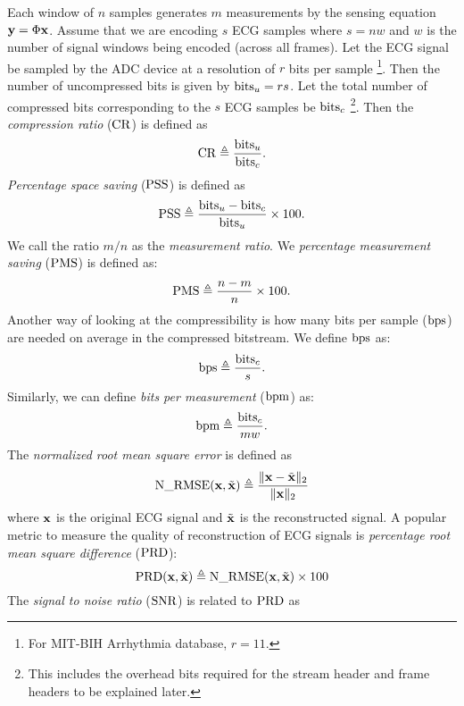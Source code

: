 Each window of $n$
samples generates $m$ measurements by the
sensing equation $\mathbf{y} = \Phi \mathbf{x}$.
Assume that we are encoding $s$ ECG samples where
$s = n w$ and $w$ is the number of signal windows
being encoded (across all frames).
Let the ECG signal be sampled by the ADC device
at a resolution of $r$ bits per sample
\footnote{For MIT-BIH Arrhythmia database, $r=11$.}.
Then the number of uncompressed bits is given by
$\mathrm{bits}_u = r s$.
Let the total number of compressed
bits corresponding to the $s$ ECG samples be
$\mathrm{bits}_c$ \footnote{This includes the overhead bits required
for the stream header and frame headers to be explained later.}.
Then the \emph{compression ratio} ($\mathrm{CR}$) is defined as
\begin{equation}
\mathrm{CR} \triangleq \frac{\mathrm{bits}_u}{\mathrm{bits}_c}.
\end{equation}
\emph{Percentage space saving} ($\mathrm{PSS}$) is defined as
\begin{equation}
\mathrm{PSS} \triangleq \frac{\mathrm{bits}_u - \mathrm{bits}_c}{\mathrm{bits}_u} \times 100.
\end{equation}
We call the ratio $m/n$ as the \emph{measurement ratio}.
We \emph{percentage measurement saving} ($\mathrm{PMS}$) is defined as:
\begin{equation}
\mathrm{PMS} \triangleq \frac{n - m}{n} \times 100.
\end{equation}
Another way of looking at the compressibility is how
many bits per sample ($\mathrm{bps}$) are needed on average in the compressed
bitstream. We define $\mathrm{bps}$ as:
\begin{equation}
\mathrm{bps} \triangleq \frac{\mathrm{bits}_c}{s}.
\end{equation}
Similarly, we can define \emph{bits per measurement} ($\mathrm{bpm}$) as:
\begin{equation}
\mathrm{bpm} \triangleq \frac{\mathrm{bits}_c}{m w}.
\end{equation}
The \emph{normalized root mean square error} is defined as
\begin{equation}
\label{eq:n-rmse}
\mathrm{N\_RMSE} (\mathbf{x}, \tilde{\mathbf{x}}) \triangleq \frac{\| \mathbf{x} - \tilde{\mathbf{x}}\|_2}{\| \mathbf{x} \|_2}
\end{equation}
where $\mathbf{x}$ is the original ECG signal and $\tilde{\mathbf{x}}$
is the reconstructed signal.
A popular metric to measure the quality of reconstruction
of ECG signals is
\emph{percentage root mean square difference} ($\mathrm{PRD}$):
\begin{equation}
\label{eq:prd}
\mathrm{PRD}(\mathbf{x}, \tilde{\mathbf{x}}) \triangleq \mathrm{N\_RMSE}(\mathbf{x}, \tilde{\mathbf{x}}) \times 100
\end{equation}
The \emph{signal to noise ratio} ($\mathrm{SNR}$) is related to $\mathrm{PRD}$ as

